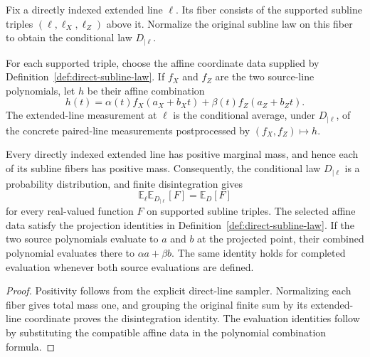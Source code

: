 \begin{definition}
	\label{def:qld-conditional-extended-line-measurement}
	\leanok
	Fix a directly indexed extended line $\ell$. Its fiber consists of the
	supported subline triples $(\ell,\ell_X,\ell_Z)$ above it. Normalize the
	original subline law on this fiber to obtain the conditional law
	$D_{\mid\ell}$.

	For each supported triple, choose the affine coordinate data supplied by
	Definition~\ref{def:direct-subline-law}. If $f_X$ and $f_Z$ are the two
	source-line polynomials, let $h$ be their affine combination
	\[
		h(t)=\alpha(t)f_X(a_X+b_Xt)+\beta(t)f_Z(a_Z+b_Zt).
	\]
	The extended-line measurement at $\ell$ is the conditional average, under
	$D_{\mid\ell}$, of the concrete paired-line measurements postprocessed by
	$(f_X,f_Z)\mapsto h$.
\end{definition}

\begin{example}
	\label{lem:qld-conditional-extended-line-properties}
	\leanok
	Every directly indexed extended line has positive marginal mass, and hence
	each of its subline fibers has positive mass. Consequently, the conditional
	law $D_{\mid\ell}$ is a probability distribution, and finite disintegration
	gives
	\[
		\mathbb E_{\ell}\mathbb E_{D_{\mid\ell}}[F]=\mathbb E_D[F]
	\]
	for every real-valued function $F$ on supported subline triples. The selected
	affine data satisfy the projection identities in
	Definition~\ref{def:direct-subline-law}. If the two source polynomials
	evaluate to $a$ and $b$ at the projected point, their combined polynomial
	evaluates there to $\alpha a+\beta b$. The same identity holds for completed
	evaluation whenever both source evaluations are defined.
\end{example}
\begin{proof}
	\leanok
	Positivity follows from the explicit direct-line sampler. Normalizing each
	fiber gives total mass one, and grouping the original finite sum by its
	extended-line coordinate proves the disintegration identity. The evaluation
	identities follow by substituting the compatible affine data in the polynomial
	combination formula.
\end{proof}

